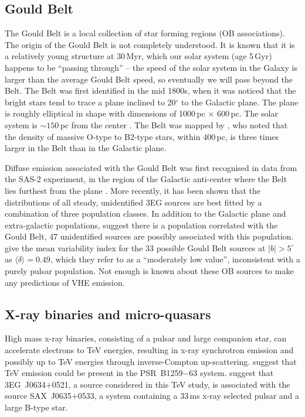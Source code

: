 \subsection{Gould Belt}
\label{SEC::SOURCES::GOULD}

\enlargethispage{12pt}
The Gould Belt is a local collection of star forming regions (OB
associations). The origin of the Gould Belt is not completely
understood. It is known that it is a relatively young structure at
30\,Myr, which our solar system (age 5\,Gyr) happens to be ``passing
through'' -- the speed of the solar system in the Galaxy is larger
than the average Gould Belt speed, so eventually we will pass beyond
the Belt. The Belt was first identified in the mid 1800s, when it was
noticed that the bright stars tend to trace a plane inclined to
20$^\circ$ to the Galactic plane. The plane is roughly elliptical in
shape with dimensions of 1000\,pc $\times$ 600\,pc. The solar system
is $\sim150$\,pc from the center
\citep{REF::LEDREW::ASTRONOTES99}. The Belt was mapped by
\citet{REF::STOTHERS::AJ1974}, who noted that the density of massive
O-type to B2-type stars, within 400\,pc, is three times larger in the
Belt than in the Galactic plane. 

Diffuse \Gray emission associated with the Gould Belt was first
recognised in data from the SAS-2 experiment, in the region of the
Galactic anti-center where the Belt lies furthest from the plane
\citep{REF::THOMPSON::APJ1977}. More recently, it has been shown that
the distributions of all steady, unidentified 3EG sources are best
fitted by a combination of three population classes. In addition to
the Galactic plane and extra-galactic populations,
\citet{REF::GEHRELS::NATURE2000} suggest there is a population
correlated with the Gould Belt, 47 unidentified sources are possibly
associated with this population. \citet{REF::NOLAN::APJ2003} give the
mean variability index for the 33 possible Gould Belt sources at
$|b|>5^\circ$ as $\langle\delta\rangle=0.49$, which they refer to as a
``moderately low value'', inconsistent with a purely pulsar
population. Not enough is known about these OB sources to make any
predictions of VHE emission.

\subsection{X-ray binaries and micro-quasars}
\label{SEC::SOURCES::XRAYBINARY}

High mass x-ray binaries, consisting of a pulsar and large companion
star, can accelerate electrons to TeV energies, resulting in x-ray
synchrotron emission and possibly \Grays up to TeV energies through
inverse-Compton up-scattering. \citet{REF::KIRK::APP1999} suggest that
TeV \Gray emission could be present in the PSR~B1259$-$63
system. \citet{REF::KAARET::APJ2000} suggest that 3EG~J0634$+$0521, a
source considered in this TeV study, is associated with the source
SAX~J0635$+$0533, a system containing a 33\,ms x-ray selected pulsar and
a large B-type star.

